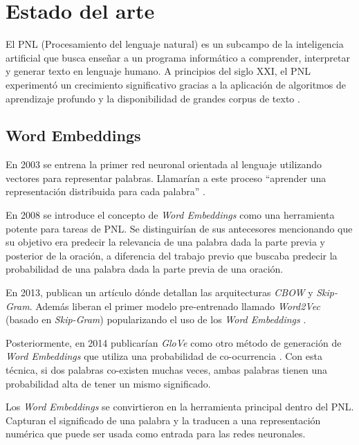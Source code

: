 
\section{Estado del arte}

El PNL (Procesamiento del lenguaje natural) es un subcampo de la inteligencia artificial que busca enseñar a un programa informático a comprender, interpretar y generar texto en lenguaje humano. A principios del siglo XXI, el PNL experimentó un crecimiento significativo gracias a la aplicación de algoritmos de aprendizaje profundo y la disponibilidad de grandes corpus de texto \citep{WEBSITE:14}.

\subsection{Word Embeddings}

En 2003 se entrena la primer red neuronal orientada al lenguaje utilizando vectores para representar palabras. Llamarían a este proceso ``aprender una representación distribuida para cada palabra'' \citep{ARTICLE:1}.

En 2008 se introduce el concepto de \textit{Word Embeddings} como una herramienta potente para tareas de PNL. Se distinguirían de sus antecesores mencionando que su objetivo era predecir la relevancia de una palabra dada la parte previa y posterior de la oración, a diferencia del trabajo previo que buscaba predecir la probabilidad de una palabra dada la parte previa de una oración.

En 2013, publican un artículo dónde detallan las arquitecturas \textit{CBOW} y \textit{Skip-Gram}. Además liberan el primer modelo pre-entrenado llamado \textit{Word2Vec} (basado en \textit{Skip-Gram}) popularizando el uso de los \textit{Word Embeddings} \citep{ARTICLE:3}.

Posteriormente, en 2014 publicarían \textit{GloVe} como otro método de generación de \textit{Word Embeddings} que utiliza una probabilidad de co-ocurrencia \citep{ARTICLE:4}. Con esta técnica, si dos palabras co-existen muchas veces, ambas palabras tienen una probabilidad alta de tener un mismo significado.

Los \textit{Word Embeddings} se convirtieron en la herramienta principal dentro del PNL. Capturan el significado de una palabra y la traducen a una representación numérica que puede ser usada como entrada para las redes neuronales.

